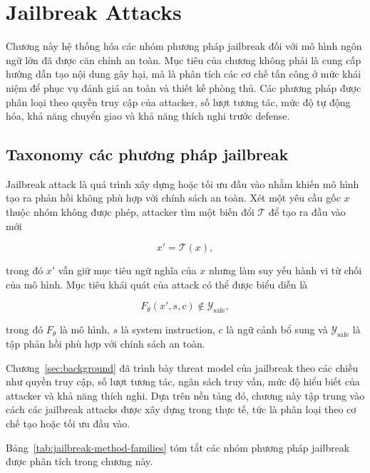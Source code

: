 \section{Jailbreak Attacks}
\label{sec:jailbreak-attacks}

Chương này hệ thống hóa các nhóm phương pháp jailbreak đối với mô hình
ngôn ngữ lớn đã được căn chỉnh an toàn. Mục tiêu của chương không phải là
cung cấp hướng dẫn tạo nội dung gây hại, mà là phân tích các cơ chế tấn
công ở mức khái niệm để phục vụ đánh giá an toàn và thiết kế phòng thủ.
Các phương pháp được phân loại theo quyền truy cập của attacker, số lượt
tương tác, mức độ tự động hóa, khả năng chuyển giao và khả năng thích nghi
trước defense.

\subsection{Taxonomy các phương pháp jailbreak}
\label{subsec:jailbreak-taxonomy}

Jailbreak attack là quá trình xây dựng hoặc tối ưu đầu vào nhằm khiến mô
hình tạo ra phản hồi không phù hợp với chính sách an toàn. Xét một yêu cầu
gốc $x$ thuộc nhóm không được phép, attacker tìm một biến đổi
$\mathcal{T}$ để tạo ra đầu vào mới

\begin{equation}
    x' = \mathcal{T}(x),
    \label{eq:jailbreak-transformed-input}
\end{equation}

trong đó $x'$ vẫn giữ mục tiêu ngữ nghĩa của $x$ nhưng làm suy yếu hành vi
từ chối của mô hình. Mục tiêu khái quát của attack có thể được biểu diễn là

\begin{equation}
    F_{\theta}(x', s, c)
    \notin
    \mathcal{Y}_{\mathrm{safe}},
    \label{eq:jailbreak-attack-goal}
\end{equation}

trong đó $F_{\theta}$ là mô hình, $s$ là system instruction, $c$ là ngữ
cảnh bổ sung và $\mathcal{Y}_{\mathrm{safe}}$ là tập phản hồi phù hợp với
chính sách an toàn.

Chương~\ref{sec:background} đã trình bày threat model của jailbreak theo
các chiều như quyền truy cập, số lượt tương tác, ngân sách truy vấn, mức
độ hiểu biết của attacker và khả năng thích nghi. Dựa trên nền tảng đó,
chương này tập trung vào cách các jailbreak attacks được xây dựng trong
thực tế, tức là phân loại theo cơ chế tạo hoặc tối ưu đầu vào.

Bảng~\ref{tab:jailbreak-method-families} tóm tắt các nhóm phương pháp
jailbreak được phân tích trong chương này.

